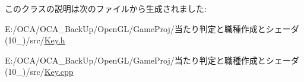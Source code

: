 このクラスの説明は次のファイルから生成されました\-:\begin{DoxyCompactItemize}
\item 
E\-:/\-O\-C\-A/\-O\-C\-A\-\_\-\-Back\-Up/\-Open\-G\-L/\-Game\-Proj/当たり判定と職種作成とシェーダ(10\-\_)/src/\hyperlink{_key_8h}{Key.\-h}\item 
E\-:/\-O\-C\-A/\-O\-C\-A\-\_\-\-Back\-Up/\-Open\-G\-L/\-Game\-Proj/当たり判定と職種作成とシェーダ(10\-\_)/src/\hyperlink{_key_8cpp}{Key.\-cpp}\end{DoxyCompactItemize}
